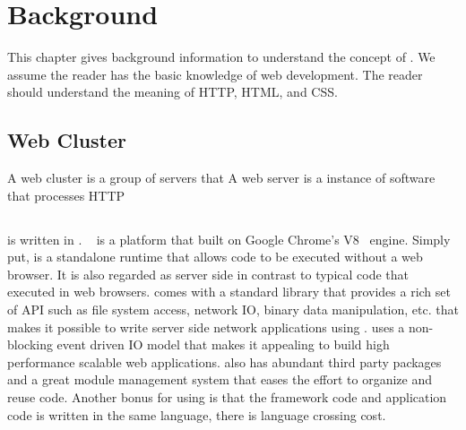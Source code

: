 \chapter{Background}

This chapter gives background information to understand the concept of \cb.
We assume the reader has the basic knowledge of web development.
The reader should understand the meaning of HTTP, HTML, \js and CSS.


\section{Web Cluster}


A web cluster is a group of servers that  
A web server is a instance of software that processes HTTP 


\section{\nodejs}

\cb is written in \nodejs.
\nodejs~\cite{tilkov2010node} is a platform that built on Google Chrome's V8~\cite{v8} \js engine.
Simply put, \nodejs is a standalone \js runtime that allows \js code to be
executed without a web browser.
It is also regarded as server side \js in contrast to typical \js code that executed in 
web browsers.
\nodejs comes with a standard library that provides a rich set of API 
such as file system access, network IO, binary data manipulation, etc. 
that makes it possible to write server side network applications using \js.
\nodejs uses a non-blocking event driven IO model that makes it appealing to
build high performance scalable web applications.
\nodejs also has abundant third party packages
and a great module management system that eases the effort to organize and reuse code.
Another bonus for using \nodejs is that the \cb framework code and application code
is written in the same language, there is language crossing cost.



